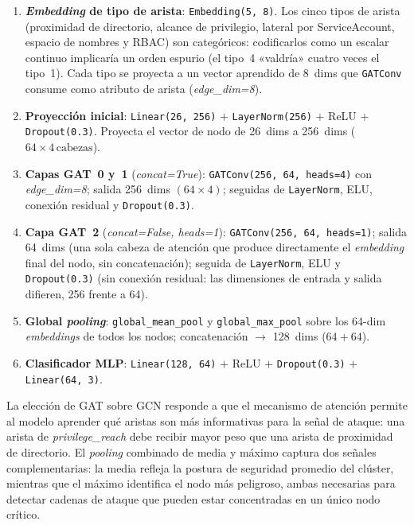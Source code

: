 \begin{enumerate}
  \item \textbf{\textit{Embedding} de tipo de arista}: \texttt{Embedding(5, 8)}.
        Los cinco tipos de arista (proximidad de directorio, alcance de
        privilegio, lateral por ServiceAccount, espacio de nombres y
        \ac{RBAC}) son categóricos: codificarlos como un escalar continuo
        implicaría un orden espurio (el tipo~4 «valdría» cuatro veces el
        tipo~1). Cada tipo se proyecta a un vector aprendido de 8~dims que
        \texttt{GATConv} consume como atributo de arista
        (\textit{edge\_dim=8}).
  \item \textbf{Proyección inicial}: \texttt{Linear(26, 256)} \(+\) \texttt{LayerNorm(256)}
        \(+\) \ac{ReLU} \(+\) \texttt{Dropout(0.3)}.
        Proyecta el vector de nodo de 26~dims a 256~dims
        (\(64 \times 4\,\text{cabezas}\)).
  \item \textbf{Capas \ac{GAT}~0 y~1} (\textit{concat=True}):
        \texttt{GATConv(256, 64, heads=4)} con \textit{edge\_dim=8};
        salida 256~dims \((64 \times 4)\); seguidas de \texttt{LayerNorm}, \ac{ELU},
        conexión residual y \texttt{Dropout(0.3)}.
  \item \textbf{Capa \ac{GAT}~2} (\textit{concat=False, heads=1}):
        \texttt{GATConv(256, 64, heads=1)}; salida 64~dims
        (una sola cabeza de atención que produce directamente
        el \textit{embedding} final del nodo, sin concatenación);
        seguida de \texttt{LayerNorm}, \acs{ELU} y \texttt{Dropout(0.3)}
        (sin conexión residual: las dimensiones de entrada y salida difieren,
        256 frente a 64).
  \item \textbf{Global \textit{pooling}}: \texttt{global\_mean\_pool} y \texttt{global\_max\_pool}
        sobre los 64-dim \textit{embeddings} de todos los nodos; concatenación
        \(\to\) 128~dims (\(64 + 64\)).
  \item \textbf{Clasificador \ac{MLP}}: \texttt{Linear(128, 64)} \(+\) \acs{ReLU} \(+\)
        \texttt{Dropout(0.3)} \(+\) \texttt{Linear(64, 3)}.
\end{enumerate}

La elección de \ac{GAT} sobre \ac{GCN} responde a que el mecanismo de atención permite al modelo
aprender qué aristas son más informativas para la señal de ataque: una arista de
\textit{privilege\_reach} debe recibir mayor peso que una arista de proximidad de
directorio. El \textit{pooling} combinado de media y máximo captura dos señales
complementarias: la media refleja la postura de seguridad promedio del clúster,
mientras que el máximo identifica el nodo más peligroso, ambas necesarias para detectar
cadenas de ataque que pueden estar concentradas en un único nodo crítico.

